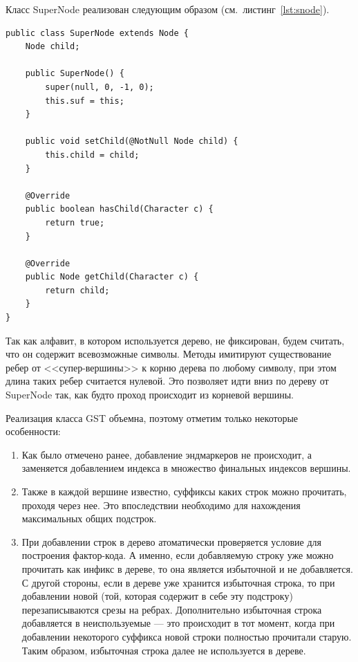 \documentclass[14pt, russian]{scrartcl}
\begin{document}
Класс SuperNode реализован следующим образом (см.~листинг~\ref{lst:snode}).

\begin{listing}[htb!]
\caption{Класс представления вспомогательной вершины}
\label{lst:snode}
\begin{verbatim}
public class SuperNode extends Node {
    Node child;

    public SuperNode() {
        super(null, 0, -1, 0);
        this.suf = this;
    }

    public void setChild(@NotNull Node child) {
        this.child = child;
    }

    @Override
    public boolean hasChild(Character c) {
        return true;
    }

    @Override
    public Node getChild(Character c) {
        return child;
    }
}
\end{verbatim}
\end{listing}

 Так как алфавит, в котором используется
дерево, не фиксирован, будем считать, что он содержит всевозможные символы. Методы имитируют существование 
ребер от <<супер-вершины>> к корню дерева по любому символу, при этом длина таких ребер считается нулевой.
Это позволяет идти вниз по дереву от SuperNode так, как будто проход происходит из корневой вершины.


Реализация класса GST объемна, поэтому отметим только некоторые особенности: 

\begin{enumerate}
\item Как было отмечено ранее, добавление эндмаркеров не происходит, а заменяется добавлением индекса в множество финальных индексов вершины.
\item Также в каждой вершине известно, суффиксы каких строк можно прочитать, проходя через нее. Это впоследствии необходимо для нахождения максимальных общих подстрок. 
\item При добавлении строк в дерево атоматически проверяется условие для построения фактор-кода. А именно, если добавляемую строку уже можно прочитать как инфикс в дереве, то она является избыточной и не добавляется. С другой стороны, если в дереве уже хранится избыточная строка, то при добавлении новой (той, которая содержит в себе эту подстроку) перезаписываются срезы на ребрах. Дополнительно избыточная строка добавляется в неиспользуемые --- это происходит в тот момент, когда при добавлении некоторого суффикса новой строки полностью прочитали старую. Таким образом, избыточная строка далее не используется в дереве. 
\end{enumerate}
\end{document}
